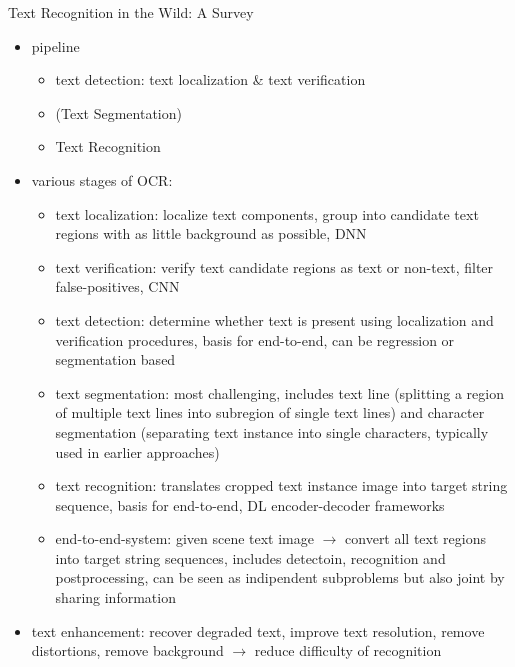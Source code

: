 Text Recognition in the Wild: A Survey~\citep{chen_text_2021}
\begin{itemize}
    \item pipeline
        \begin{itemize}
            \item text detection: text localization \& text verification
            \item (Text Segmentation)
            \item Text Recognition
        \end{itemize}
    \item various stages of \ac{OCR}:
        \begin{itemize}
            \item text localization: localize text components, group into candidate text regions with
                as little background as possible, DNN
            \item text verification: verify text candidate regions as text or non-text,
                filter false-positives, CNN
            \item text detection: determine whether text is present using localization and verification
                procedures, basis for end-to-end, can be regression or segmentation based
            \item text segmentation: most challenging, includes text line (splitting a region of multiple
                text lines into subregion of single text lines) and character segmentation (separating
                text instance into single characters, typically used in earlier approaches)
            \item text recognition: translates cropped text instance image into target string sequence,
                basis for end-to-end, DL encoder-decoder frameworks
            \item end-to-end-system: given scene text image $\rightarrow$ convert all text regions into
                target string sequences, includes detectoin, recognition and postprocessing, can be
                seen as indipendent subproblems but also joint by sharing information
        \end{itemize}
    \item text enhancement: recover degraded text, improve text resolution, remove distortions,
        remove background $\rightarrow$ reduce difficulty of recognition
\end{itemize}

